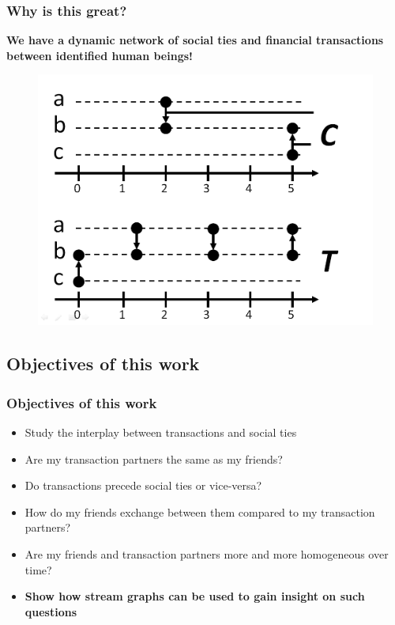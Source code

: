 \documentclass{beamer}
\begin{document}

\begin{frame}
	\frametitle{Why is this great?}
	\textbf{{\footnotesize We have a dynamic network of social ties and financial transactions between identified human beings!}}
	\begin{center}
		\begin{figure}
			\includegraphics[width=.8\linewidth]{./figures/delta-t-0}
		\end{figure}
	\end{center}
\end{frame}


\subsection{Objectives of this work}

\begin{frame}
	\frametitle{Objectives of this work}
	\begin{itemize}
		\item<1-> Study the interplay between transactions and social ties
		\item<2-> Are my transaction partners the same
as my friends?
		\item<3-> Do transactions precede social ties or vice-versa?
		\item<4-> How do my friends exchange between them compared to my transaction partners?
		\item<5-> Are my friends and transaction partners more and more homogeneous over time?
		\item<6-> \textbf{Show how stream graphs can be used to gain insight on such questions}	 
	\end{itemize}
\end{frame}
\end{document}
